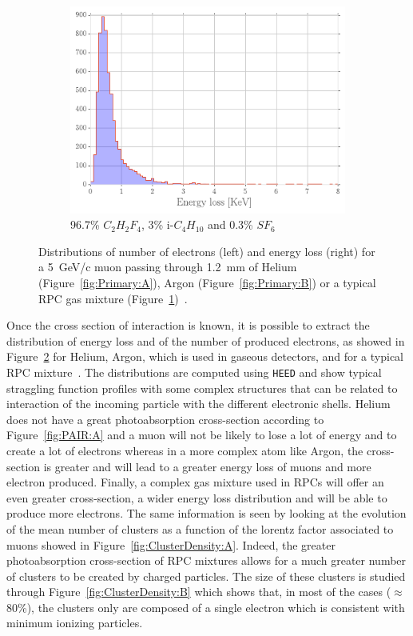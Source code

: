 \begin{figure}[H]
\begin{subfigure}{\linewidth}
			\includegraphics[width = 0.5\plotwidth]{fig/chapt4/E_loss_RPC.pdf}
			\caption{\label{fig:Primary:C} 96.7\% $C_2H_2F_4$, 3\% i-$C_4H_{10}$ and 0.3\% $SF_6$~\cite{RIEGLER2003}}
		\end{subfigure}
		\caption{\label{fig:Primary} Distributions of number of electrons (left) and energy loss (right) for a \SI{5}{GeV/c} muon passing through \SI{1.2}{mm} of Helium (Figure~\ref{fig:Primary:A}), Argon (Figure~\ref{fig:Primary:B}) or a typical RPC gas mixture (Figure~\ref{fig:Primary:C})~\cite{VINCENT2017}.}
	\end{figure}
	
	Once the cross section of interaction is known, it is possible to extract the distribution of energy loss and of the number of produced electrons, as showed in Figure~\ref{fig:Primary} for Helium, Argon, which is used in gaseous detectors, and for a typical RPC mixture~\cite{VINCENT2017}. The distributions are computed using \texttt{HEED} and show typical straggling function profiles with some complex structures that can be related to interaction of the incoming particle with the different electronic shells. Helium does not have a great photoabsorption cross-section according to Figure~\ref{fig:PAIR:A} and a muon will not be likely to lose a lot of energy and to create a lot of electrons whereas in a more complex atom like Argon, the cross-section is greater and will lead to a greater energy loss of muons and more electron produced. Finally, a complex gas mixture used in RPCs will offer an even greater cross-section, a wider energy loss distribution and will be able to produce more electrons. The same information is seen by looking at the evolution of the mean number of clusters as a function of the lorentz factor associated to muons showed in Figure~\ref{fig:ClusterDensity:A}. Indeed, the greater photoabsorption cross-section of RPC mixtures allows for a much greater number of clusters to be created by charged particles. The size of these clusters is studied through Figure~\ref{fig:ClusterDensity:B} which shows that, in most of the cases ($\approx$80\%), the clusters only are composed of a single electron which is consistent with minimum ionizing particles.
	
